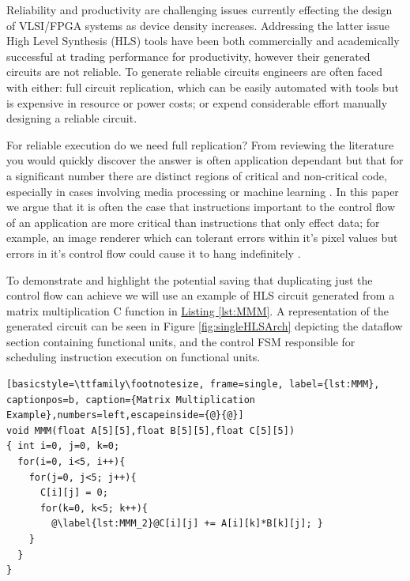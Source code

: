 \providecommand*{\lstnumberautorefname}{line}

Reliability and productivity are challenging issues
currently effecting the design of VLSI/FPGA systems as
device density increases.
Addressing the latter issue High Level Synthesis (HLS) tools \cite{canis2011legup} have
been both commercially and academically successful at trading
performance for productivity, however their generated circuits are not reliable.
To generate reliable circuits engineers are often faced with either:
full circuit replication, which can be easily automated with tools but
is expensive in resource or power costs; or expend considerable
effort manually designing a reliable circuit.

For reliable execution do we need full replication?
From reviewing the literature you would quickly discover the answer
is often application dependant but that for a significant number
there are distinct regions of critical and non-critical code,
especially in cases involving media processing or machine
learning\cite{wong2006soft} \cite{liu2012flikker}.
In this paper we argue that it is often the case that instructions important to the control flow of an application are more critical
than instructions that only effect data; for example, an image renderer which can tolerant errors within
it's pixel values but errors in it's control flow could cause it to hang indefinitely \cite{sampson2011enerj}.

To demonstrate and highlight the potential saving that duplicating just
the control flow can achieve we will use an example of HLS circuit generated from a
matrix multiplication C function in \hyperref[lst:MMM]{Listing \ref{lst:MMM}}.
A representation of the generated circuit can be seen in Figure \ref{fig:singleHLSArch}
depicting the dataflow section containing functional units, and the
control FSM responsible for scheduling instruction execution on functional units.

\lstset{language=C}
\begin{lstlisting}[basicstyle=\ttfamily\footnotesize, frame=single, label={lst:MMM}, captionpos=b, caption={Matrix Multiplication Example},numbers=left,escapeinside={@}{@}]
void MMM(float A[5][5],float B[5][5],float C[5][5])
{ int i=0, j=0, k=0;
  for(i=0, i<5, i++){
    for(j=0, j<5; j++){
      C[i][j] = 0;
      for(k=0, k<5; k++){
        @\label{lst:MMM_2}@C[i][j] += A[i][k]*B[k][j]; }
    }
  }
}
\end{lstlisting}

